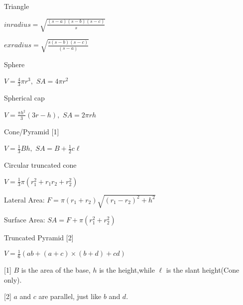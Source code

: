 \newcommand\SA{\mathit{SA}}
%

\begin{small}

Triangle

$inradius = \sqrt{\frac{(s-a)(s-b)(s-c)}{s}}$

$exradius = \sqrt{\frac{s(s-b)(s-c)}{(s-a)}}$

Sphere 

$V= \frac{4}{3} \pi r^3,$
$\SA =4\pi r^2$ 

Spherical cap

$V=\displaystyle\frac{\pi h^2}{3} \left(3r-h \right),$
$\SA =2\pi rh$ 

Cone/Pyramid [1]

$V= \frac{1}{3} Bh,$
$\SA =B+\frac{1}{2} c \ell$ 

Circular truncated cone 

$V=\frac{1}{3} \pi \left( r_1^2+r_1 r_2 +r_2^2 \right)$ 

Lateral Area: $F=\pi \left( r_1 + r_2 \right) \sqrt{ \left( r_1 - r_2 \right) ^2+h^2}$

Surface Area: $\SA = F+ \pi \left( r_1^2+r_2^2\right) $

Truncated Pyramid [2]

$ V= \frac{1}{6} \left( ab+ \left( a+c \right) \times \left( b+d\right) + cd \right) $



[1]  $B$ is the area of the base, $h$ is the height,while $\ell$ is the slant height(Cone only).

[2] $a$ and $c$ are parallel, just like $b$ and $d$.
\end{small}
%